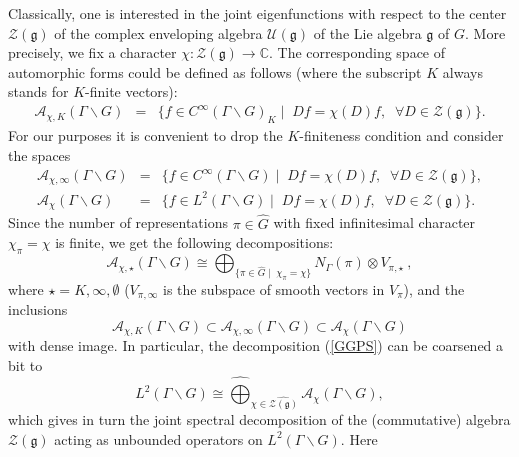 \documentclass[10]{amsart}
\theoremstyle{remark}
\theoremstyle{definition}
\numberwithin{equation}{section}
\newcommand{\Cal}{\mathcal}
\begin{document}
Classically, one is interested in the joint eigenfunctions with respect to the center ${\Cal Z}({\mathfrak g})$ of the complex enveloping algebra ${\Cal U}({\mathfrak g})$ of the Lie algebra ${\mathfrak g}$ of $G$. More precisely, we fix a character $\chi:{\Cal Z}({\mathfrak g})\rightarrow{\mathbb C}$. The corresponding space of automorphic forms
could be defined as follows (where the subscript $K$ always stands for $K$-finite vectors):
%
\begin{eqnarray*}
{\mathcal A}_{\chi,K}(\Gamma\backslash G)&=&\{f\in C^\infty(\Gamma\backslash G)_{K}\mid\; Df=\chi(D)f,\;\;\forall D\in {\Cal Z}({\mathfrak g})\}.
\end{eqnarray*}
For our purposes it is convenient to drop the $K$-finiteness condition and consider the spaces
\begin{eqnarray*}
{\mathcal A}_{\chi,\infty}(\Gamma\backslash G)&=&\{f\in C^\infty(\Gamma\backslash G)\mid\; Df=\chi(D)f,\;\;\forall D\in{\Cal Z}({\mathfrak g})\},\\
{\mathcal A}_{\chi}(\Gamma\backslash G)&=&\{f\in L^2(\Gamma\backslash G)\mid\; Df=\chi(D)f,\;\;\forall D\in {\Cal Z}({\mathfrak g})\}.
\end{eqnarray*}
%
Since the number of representations $\pi\in\widehat{G}$ with fixed infinitesimal character $\chi_\pi=\chi$ is finite, we get the following decompositions:
%
\begin{equation*}
{\mathcal A}_{\chi,\star}(\Gamma\backslash G)\cong\bigoplus_{\{\pi\in\widehat{G}\mid\;\chi_\pi=\chi\}}N_\Gamma(\pi)\otimes V_{\pi,\star}\ ,
\end{equation*}
%
where $\star=K,\infty,\emptyset$ ($V_{\pi,\infty}$ is the subspace of  smooth vectors in $V_\pi$), and the inclusions
%
\begin{equation*}
{\mathcal A}_{\chi,K}(\Gamma\backslash G)\subset{\mathcal A}_{\chi,\infty}(\Gamma\backslash G)\subset {\mathcal A}_{\chi}(\Gamma\backslash G)
\end{equation*}
%
with dense image. In particular, the decomposition (\ref{GGPS}) can be coarsened a bit to 
%
\begin{equation}\label{GGPSbis}
L^2(\Gamma\backslash G)\cong \widehat{\bigoplus}_{\chi\in\widehat{{\Cal Z}({\mathfrak g})}}{\mathcal A}_{\chi}(\Gamma\backslash G),
\end{equation}
% 
which gives in turn the joint spectral decomposition of the (commutative) algebra ${\Cal Z}({\mathfrak g})$ acting as unbounded operators on $L^2(\Gamma\backslash G)$. Here 
\end{document}
